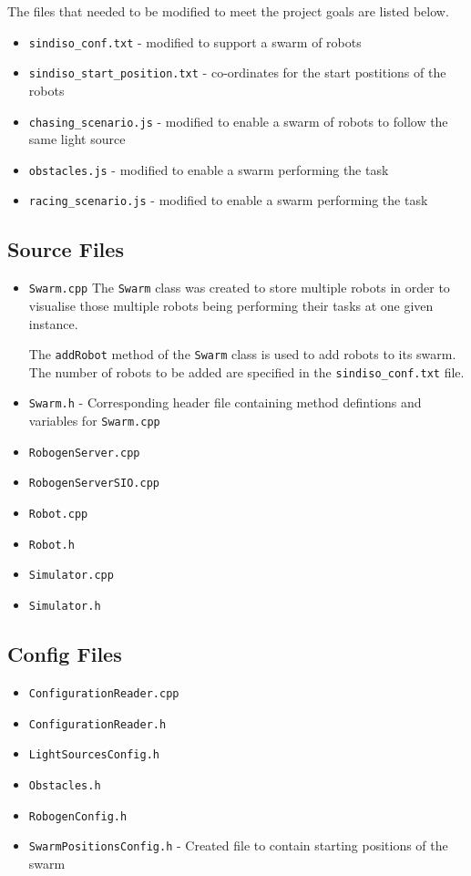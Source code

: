 \documentclass[11pt,a4paper]{article}
\begin{document}
The files that needed to be modified to meet the project goals are listed below.

\begin{itemize}
    \item \texttt{sindiso\_conf.txt} - modified to support a swarm of robots
    \item \texttt{sindiso\_start\_position.txt} - co-ordinates for the start
        postitions of the robots
    \item \texttt{chasing\_scenario.js} - modified to enable a swarm of robots
        to follow the same light source
    \item \texttt{obstacles.js} - modified to enable a swarm performing the task
    \item \texttt{racing\_scenario.js} - modified to enable a swarm performing
        the task
\end{itemize}

\subsection{Source Files}
\begin{itemize}
    \item \texttt{Swarm.cpp} The \texttt{Swarm} class was created to store
        multiple robots in order to visualise those multiple robots being
        performing their tasks at one given instance.

        The \texttt{addRobot} method of the \texttt{Swarm} class is used to add
        robots to its swarm. The number of robots to be added are specified in
        the \texttt{sindiso\_conf.txt} file.
    \item \texttt{Swarm.h} - Corresponding header file containing method
        defintions and variables for \texttt{Swarm.cpp}
    \item \texttt{RobogenServer.cpp}
    \item \texttt{RobogenServerSIO.cpp}
    \item \texttt{Robot.cpp}
    \item \texttt{Robot.h}
    \item \texttt{Simulator.cpp}
    \item \texttt{Simulator.h}
\end{itemize}

\subsection{Config Files}
\begin{itemize}
    \item \texttt{ConfigurationReader.cpp}
    \item \texttt{ConfigurationReader.h}
    \item \texttt{LightSourcesConfig.h}
    \item \texttt{Obstacles.h}
    \item \texttt{RobogenConfig.h}
    \item \texttt{SwarmPositionsConfig.h} - Created file to contain starting
        positions of the swarm
\end{itemize}
\end{document}
